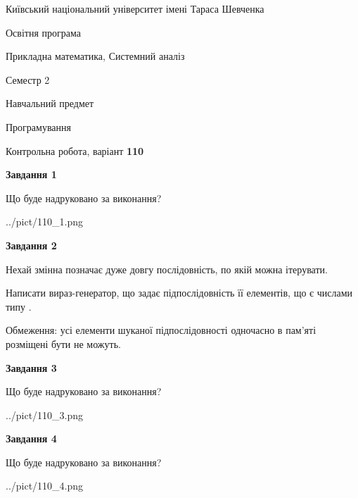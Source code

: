 \documentclass[12pt, ukrainian]{article}
\begin{document}
{{\begin {small}\par
{ \center  Київський національний університет імені Тараса Шевченка \par}
{\parbox {5 cm}{Освітня програма \hfill}{\parbox {8 cm}{Прикладна математика, Системний аналіз \hfill}}\parbox {5 cm}{\hfill Семестр 2}}\par
{\parbox {5 cm} {Навчальний предмет \hfill}\parbox {7 cm}{Програмування \hfill}\parbox {6cm}{\hfill}\par}\vspace{-7pt} \end{small}}{\center Контрольна робота, варіант  \No \textbf
{ 110 }\par}}
{
\begin {large}
{\begin {center}\textbf{Завдання 1}\end {center}}\par
Що буде надруковано за виконання?\par\par
\begin{center}
	{../pict/110_1.png}
\end{center}
\newpage

{\begin {center}\textbf{Завдання 2}\end {center}}\par
Нехай змінна  позначає дуже довгу послідовність, по якій можна ітерувати.

Написати вираз-генератор, що задає підпослідовність її елементів, що є числами типу .

Обмеження: усі елементи шуканої підпослідовності одночасно в пам'яті розміщені бути не можуть.\par
\newpage

{\begin {center}\textbf{Завдання 3}\end {center}}\par
Що буде надруковано за виконання?\par
\begin{center}
	{../pict/110_3.png}
\end{center}
\newpage

{\begin {center}\textbf{Завдання 4}\end {center}}\par
Що буде надруковано за виконання?\par
\begin{center}
	{../pict/110_4.png}
\end{center}
\newpage


\end{large}}
\end{document}
